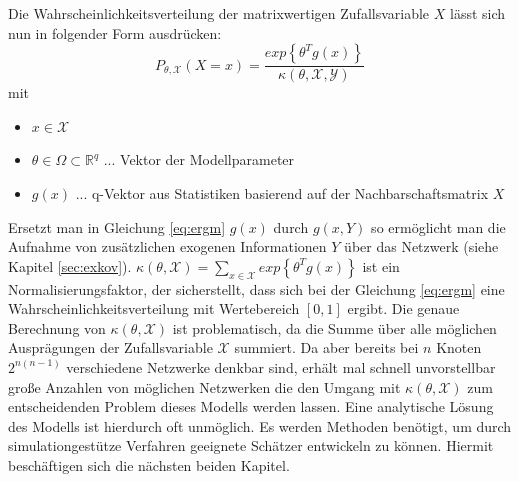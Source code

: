 \documentclass[a4paper,ngerman,oneside,titlepage,bibliography=totoc,11pt]{scrreprt}
\begin{document}
Die Wahrscheinlichkeitsverteilung der matrixwertigen Zufallsvariable $X$ lässt sich nun in folgender Form ausdrücken:
\begin{equation}
P_{\theta, \mathcal{X}}(X = x) = \frac{exp\left\{\theta^T g(x)\right\}}{\kappa(\theta, \mathcal{X, Y})}
\label{eq:ergm}
\end{equation}
mit

\begin{itemize}
	\item $x \in \mathcal{X}$
	\item $\theta \in \Omega \subset \mathbb{R}^q$ ... Vektor der Modellparameter
	\item $g(x)$ ... q-Vektor aus Statistiken basierend auf der Nachbarschaftsmatrix $X$
\end{itemize}
Ersetzt man in Gleichung \ref{eq:ergm} $g(x)$ durch $g(x,Y)$ so ermöglicht man die Aufnahme von zusätzlichen exogenen Informationen $Y$ über das Netzwerk (siehe Kapitel \ref{sec:exkov}). $\kappa(\theta, \mathcal{X}) = \sum_{x \in \mathcal{X}}{exp\left\{\theta^T g(x)\right\}}$ ist ein Normalisierungsfaktor, der sicherstellt, dass sich bei der Gleichung \ref{eq:ergm} eine Wahrscheinlichkeitsverteilung mit Wertebereich $[0,1]$ ergibt. Die genaue Berechnung von $\kappa(\theta, \mathcal{X})$ ist problematisch, da die Summe über alle möglichen Ausprägungen der Zufallsvariable $\mathcal{X}$ summiert. Da aber bereits bei $n$ Knoten $2^{n(n-1)}$ verschiedene Netzwerke denkbar sind, erhält mal schnell unvorstellbar große Anzahlen von möglichen Netzwerken die den Umgang mit  $\kappa(\theta, \mathcal{X})$ zum entscheidenden Problem dieses Modells werden lassen. Eine analytische Lösung des Modells ist hierdurch oft unmöglich. Es werden Methoden benötigt, um durch simulationgestütze Verfahren geeignete Schätzer entwickeln zu können. Hiermit beschäftigen sich die nächsten beiden Kapitel.
\end{document}

